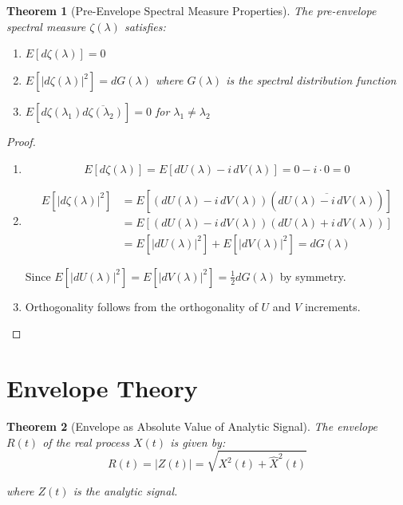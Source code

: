 \documentclass[11pt]{article}
\newtheorem{theorem}{Theorem}[section]
\begin{document}
\begin{theorem}[Pre-Envelope Spectral Measure Properties]
\label{thm:pre_envelope_properties}
The pre-envelope spectral measure $\zeta(\lambda)$ satisfies:
\begin{enumerate}
\item $E[d\zeta(\lambda)] = 0$
\item $E[|d\zeta(\lambda)|^2] = dG(\lambda)$ where $G(\lambda)$ is the spectral distribution function
\item $E[d\zeta(\lambda_1) \overline{d\zeta(\lambda_2)}] = 0$ for $\lambda_1 \neq \lambda_2$
\end{enumerate}
\end{theorem}

\begin{proof}
\begin{enumerate}
\item 
\begin{equation}
\label{eq:pre_envelope_mean}
E[d\zeta(\lambda)] = E[dU(\lambda) - i \, dV(\lambda)] = 0 - i \cdot 0 = 0
\end{equation}

\item 
\begin{align}
\label{eq:pre_envelope_variance}
E[|d\zeta(\lambda)|^2] &= E[(dU(\lambda) - i \, dV(\lambda))(\overline{dU(\lambda) - i \, dV(\lambda)})] \nonumber \\
&= E[(dU(\lambda) - i \, dV(\lambda))(dU(\lambda) + i \, dV(\lambda))] \nonumber \\
&= E[|dU(\lambda)|^2] + E[|dV(\lambda)|^2] = dG(\lambda)
\end{align}

Since $E[|dU(\lambda)|^2] = E[|dV(\lambda)|^2] = \frac{1}{2}dG(\lambda)$ by symmetry.

\item Orthogonality follows from the orthogonality of $U$ and $V$ increments.
\end{enumerate}
\end{proof}

\section{Envelope Theory}

\begin{theorem}[Envelope as Absolute Value of Analytic Signal]
\label{thm:envelope_absolute_value}
The envelope $R(t)$ of the real process $X(t)$ is given by:
\begin{equation}
\label{eq:envelope_def}
R(t) = |Z(t)| = \sqrt{X^2(t) + \hat{X}^2(t)}
\end{equation}

where $Z(t)$ is the analytic signal.
\end{theorem}
\end{document}
